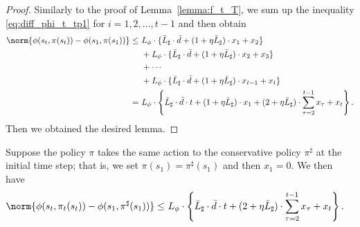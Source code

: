 \smallskip
\begin{proof}
    Similarly to the proof of Lemma~\ref{lemma:f_t_T}, we sum up the inequality \eqref{eq:diff_phi_t_tp1} for $i = 1, 2, \ldots, t-1$ and then obtain
    \begin{align*}
        \norm{\phi(s_t, \pi(s_t)) - \phi(s_1, \pi(s_1))}
        \le &\ L_\phi \cdot \{\bar{L}_\sharp \cdot \bar{d} + (1 + \eta \bar{L}_\sharp) \cdot x_1 + x_{2}\} \\
        &\ + L_\phi \cdot \{\bar{L}_\sharp \cdot \bar{d} + (1 + \eta \bar{L}_\sharp) \cdot x_{2} + x_{3}\} \\
        &\ + \cdots \\
        &\ + L_\phi \cdot \{\bar{L}_\sharp \cdot \bar{d} + (1 + \eta \bar{L}_\sharp) \cdot x_{t-1} + x_{t}\} \\
        = &\ L_\phi \cdot \left\{\bar{L}_\sharp \cdot \bar{d} \cdot t + (1 + \eta \bar{L}_\sharp) \cdot x_1 + (2 + \eta \bar{L}_\sharp) \cdot \sum_{\tau=2}^{t-1} x_\tau + x_t \right\}.
    \end{align*}
    Then we obtained the desired lemma.
\end{proof}

\begin{lemma}
    \label{lemma:11}
    Suppose the policy $\pi$ takes the same action to the conservative policy $\pi^\sharp$ at the initial time step; that is, we set $\pi(s_1) = \pi^\sharp(s_1)$ and then $x_1 = 0$.
    We then have
    \begin{align*}
        \norm{\phi(s_t, \pi_t(s_t)) - \phi(s_1, \pi^\sharp(s_1))}
        \le &\ L_\phi \cdot \left\{\bar{L}_\sharp \cdot \bar{d} \cdot t + (2 + \eta \bar{L}_\sharp) \cdot \sum_{\tau=2}^{t-1} x_\tau + x_{t} \right\}.
    \end{align*}
\end{lemma}

